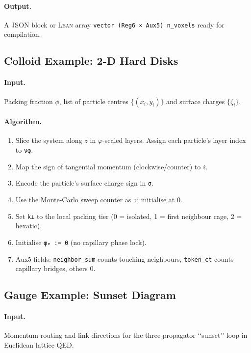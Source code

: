 \documentclass[11pt,a4paper]{article}
\begin{document}
\paragraph{Output.}
A JSON block or \textsc{Lean} array
\verb|vector (Reg6 × Aux5) n_voxels| ready for compilation.

\subsection{Colloid Example: 2-D Hard Disks}
\label{subsec:init-colloid}

\paragraph{Input.}  Packing fraction $\phi$, list of particle
centres $\{(x_i,y_i)\}$ and surface charges $\{\zeta_i\}$.

\paragraph{Algorithm.}
\begin{enumerate}
  \item Slice the system along $z$ in $\varphi$-scaled layers.  Assign
        each particle’s layer index to \texttt{νφ}.
  \item Map the sign of tangential momentum (clockwise/counter) to
        \texttt{ℓ}.
  \item Encode the particle’s surface charge sign in \texttt{σ}.
  \item Use the Monte-Carlo sweep counter as \texttt{τ};
        initialise at $0$.
  \item Set \texttt{k⊥} to the local packing tier
        (0 = isolated, 1 = first neighbour cage, 2 = hexatic). 
  \item Initialise \texttt{φₑ := 0} (no capillary phase lock).
  \item Aux5 fields: \texttt{neighbor\_sum} counts touching neighbours,
        \texttt{token\_ct} counts capillary bridges, others $0$.
\end{enumerate}

\subsection{Gauge Example: Sunset Diagram}
\label{subsec:init-gauge}

\paragraph{Input.}  Momentum routing and link directions for the
three-propagator ‘‘sunset’’ loop in Euclidean lattice QED.
\end{document}
